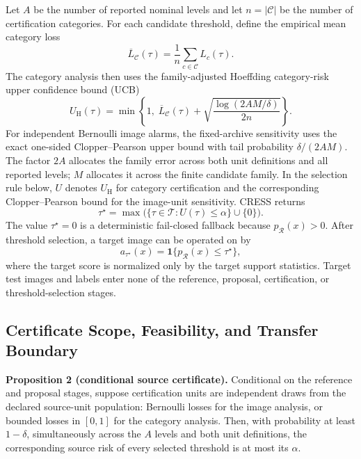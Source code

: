 Let $A$ be the number of reported nominal levels and let $n=|\mathcal{C}|$ be the number of certification categories. For each candidate threshold, define the empirical mean category loss
\begin{equation}\label{eq:cress-mean-category-loss}
    \overline{L}_{\mathcal C}(\tau)=\frac{1}{n}\sum_{c\in\mathcal{C}}L_c(\tau).
\end{equation}
The category analysis then uses the family-adjusted Hoeffding category-risk upper confidence bound (UCB)
\begin{equation}\label{eq:sc3r-ucb}
    U_{\mathrm{H}}(\tau)=\min\!\left\{1,\;
    \overline{L}_{\mathcal C}(\tau)+
    \sqrt{\frac{\log(2AM/\delta)}{2n}}\right\}.
\end{equation}
For independent Bernoulli image alarms, the fixed-archive sensitivity uses the exact one-sided Clopper--Pearson upper bound with tail probability $\delta/(2AM)$. The factor $2A$ allocates the family error across both unit definitions and all reported levels; $M$ allocates it across the finite candidate family. In the selection rule below, $U$ denotes $U_{\mathrm H}$ for category certification and the corresponding Clopper--Pearson bound for the image-unit sensitivity. CRESS returns
\begin{equation}\label{eq:cress-selected-threshold}
    \tau^\star=
    \max\bigl(\{\tau\in\mathcal{T}:U(\tau)\leq\alpha\}\cup\{0\}\bigr).
\end{equation}
The value $\tau^\star=0$ is a deterministic fail-closed fallback because $p_{\mathcal{R}}(x)>0$. After threshold selection, a target image can be operated on by
\begin{equation}\label{eq:cress-target-decision}
    a_{\tau^\star}(x)
    =\mathbf{1}\{p_{\mathcal{R}}(x)\leq\tau^\star\},
\end{equation}
where the target score is normalized only by the target support statistics. Target test images and labels enter none of the reference, proposal, certification, or threshold-selection stages.

\subsection{Certificate Scope, Feasibility, and Transfer Boundary}
\noindent\textbf{Proposition 2 (conditional source certificate).} Conditional on the reference and proposal stages, suppose certification units are independent draws from the declared source-unit population: Bernoulli losses for the image analysis, or bounded losses in $[0,1]$ for the category analysis. Then, with probability at least $1-\delta$, simultaneously across the $A$ levels and both unit definitions, the corresponding source risk of every selected threshold is at most its $\alpha$.

